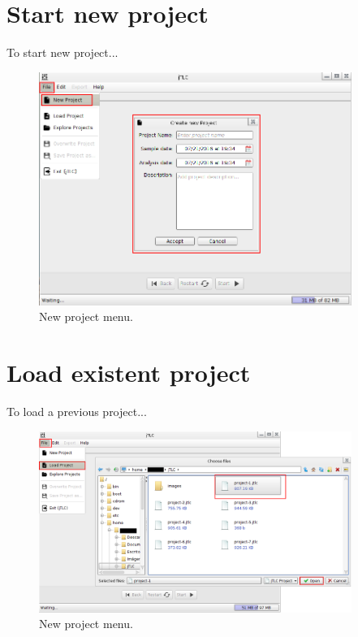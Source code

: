 \section*{Start new project}
To start new project...
\begin{figure}[H]
	\vspace{0cm}
	\centering
	\includegraphics[width=385px]{imagenes/new_project}
	\centering
	\vspace{-0.4cm}
	\caption{New project menu.}
	\label{fig:new_project}
	\vspace{-0.25cm}
\end{figure}
\newpage

\section{Load existent project}
To load a previous project...
\begin{figure}[H]
	\vspace{0cm}
	\centering
	\includegraphics[width=385px]{imagenes/load_project}
	\centering
	\vspace{-0.4cm}
	\caption{New project menu.}
	\label{fig:load_project}
	\vspace{-0.25cm}
\end{figure}
\newpage

